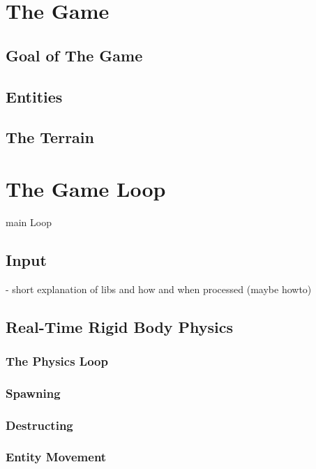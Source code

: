 \documentclass[a4paper,12pt]{llncs}
\numberwithin{equation}{section}
\begin{document}
\section{The Game}

\subsection{Goal of The Game}

\subsection{Entities}

\subsection{The Terrain}

\section{The Game Loop}

main Loop

\subsection{Input}

- short explanation of libs and how and when processed (maybe howto)


\subsection{Real-Time Rigid Body Physics}

\subsubsection{The Physics Loop}

\subsubsection{Spawning}

\subsubsection{Destructing}

\subsubsection{Entity Movement}
\end{document}
